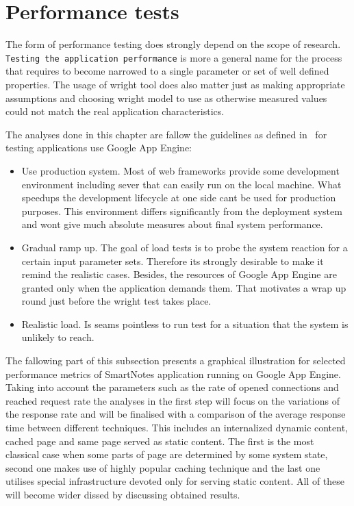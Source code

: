 \section{Performance tests}\label{sec:performance}
The form of performance testing  does strongly depend on the scope of research. \texttt{Testing the application performance} is more a general name for the process that requires to become narrowed to a single parameter or set of well defined properties. The usage of wright tool does also matter just as making appropriate assumptions and choosing wright model to use as otherwise measured values could not match the real application characteristics.   

The analyses done in this chapter are fallow the guidelines as defined in~\cite{gae_best_practises_plus_load_tests} for testing applications use Google App Engine:
\begin{itemize}
	\item{Use production system. Most of web frameworks provide some development environment including sever that can easily run on the local machine. What speedups the development lifecycle at one side cant be used for production purposes. This environment differs significantly from the deployment system and wont give much absolute measures about final system performance.}
	\item{Gradual ramp up. The goal of load tests is to probe the system reaction for a certain input parameter sets. Therefore its strongly desirable to make it remind the realistic cases. Besides, the resources of Google App Engine are granted only when the application demands them. That motivates a wrap up round just before the wright test takes place.}
	\item{Realistic load. Is seams pointless to run test for a situation that the system is unlikely to reach.}
\end{itemize}
The fallowing part of this subsection presents a graphical illustration for selected performance metrics of SmartNotes application running on Google App Engine. Taking into account the parameters such as the rate of opened connections and reached request rate the analyses in the first step will focus on the variations of the response rate and will be finalised with a comparison of the average response time between different techniques. This includes an internalized dynamic content, cached page and same page served as static content. The first is the most classical case when some parts of page are determined by some system state, second one makes use of highly popular caching technique and the last one utilises special infrastructure devoted only for serving static content. All of these will become wider dissed by discussing obtained results. 


